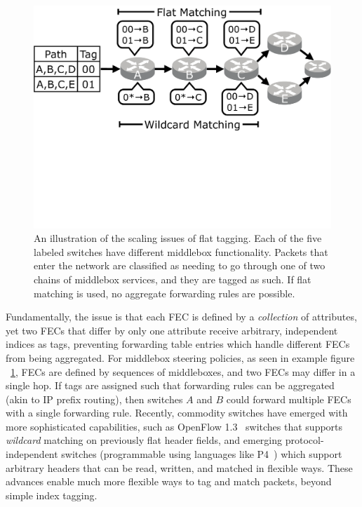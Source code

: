 \begin{figure}[t!] 
\begin{minipage}{1\linewidth}
\includegraphics[trim={0 11.5cm 0 0}, clip, width=\linewidth]{figures/mbox_path_example}
\end{minipage} 
\caption{An illustration of the scaling issues of flat tagging. Each of the five labeled switches have different middlebox functionality. Packets that enter the network are classified as needing to go through one of two chains of middlebox services, and they are tagged as such. If flat matching is used, no aggregate forwarding rules are possible.  }
\label{fig:mbox_path}
\end{figure}
Fundamentally, the issue is that each FEC is defined by a \emph{collection} of attributes, yet two FECs that differ by only one attribute receive arbitrary, independent indices as tags, preventing forwarding table entries which handle different FECs from being aggregated. For middlebox steering policies, as seen in example figure ~\ref{fig:mbox_path}, FECs are defined by sequences of middleboxes, and two FECs may differ in a single hop.  If tags are assigned such that forwarding rules can be aggregated (akin to IP prefix routing), then switches $A$ and $B$ could forward multiple FECs with a single forwarding rule.
Recently, commodity switches have emerged with more sophisticated capabilities, such as OpenFlow 1.3~\cite{of13} switches that supports \emph{wildcard} matching on previously flat header fields, and emerging protocol-independent switches (programmable using languages like P4~\cite{P4}) which support arbitrary headers that can be read, written, and matched in flexible ways.  These advances enable much more flexible ways to tag and match packets, beyond simple index tagging. 

